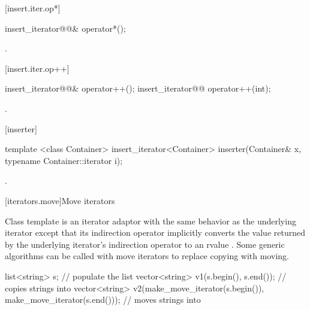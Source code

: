[insert.iter.op*]{}

%
\begin{itemdecl}
insert_iterator@@& operator*();
\end{itemdecl}

\begin{itemdescr}
\pnum
\returns
{}.
\end{itemdescr}

[insert.iter.op++]{}

%
\begin{itemdecl}
insert_iterator@@& operator++();
insert_iterator@@ operator++(int);
\end{itemdecl}

\begin{itemdescr}
\pnum
\returns
{}.
\end{itemdescr}

[inserter]{}

%
\begin{itemdecl}
template <class Container>
  insert_iterator<Container> inserter(Container& x, typename Container::iterator i);
\end{itemdecl}

\begin{itemdescr}
\pnum
\returns
{}.
\end{itemdescr}

[iterators.move]{Move iterators}

\pnum
Class template  is an iterator adaptor
with the same behavior as the underlying iterator except that its
indirection operator implicitly converts the value returned by the
underlying iterator's indirection operator to an rvalue 
.
Some generic algorithms can be called with move iterators to replace
copying with moving.

\pnum
\enterexample

\begin{codeblock}
list<string> s;
// populate the list 
vector<string> v1(s.begin(), s.end());          // copies strings into 
vector<string> v2(make_move_iterator(s.begin()),
                  make_move_iterator(s.end())); // moves strings into 
\end{codeblock}

